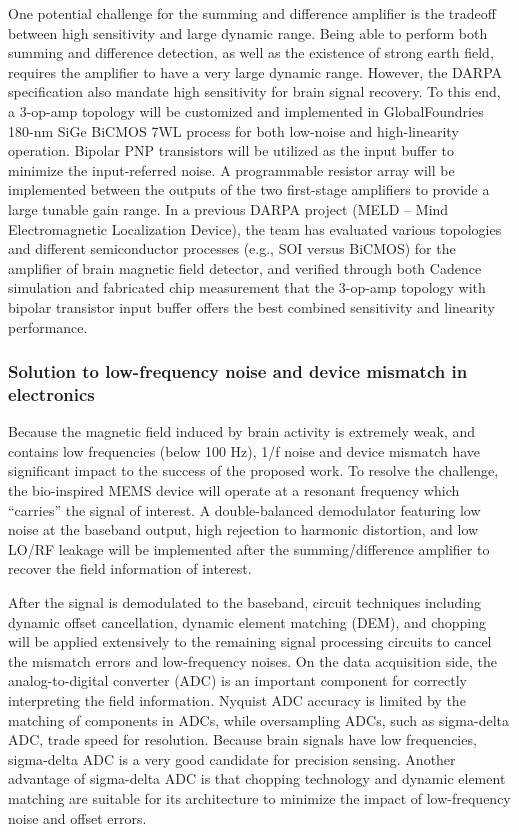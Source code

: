 One potential challenge for the summing and difference amplifier is the tradeoff between high sensitivity and large dynamic range. Being able to perform both summing and difference detection, as well as the existence of strong earth field, requires the amplifier to have a very large dynamic range. However, the DARPA specification also mandate high sensitivity for brain signal recovery. To this end, a 3-op-amp topology will be customized and implemented in GlobalFoundries 180-nm SiGe BiCMOS 7WL process for both low-noise and high-linearity operation. Bipolar PNP transistors will be utilized as the input buffer to minimize the input-referred noise. A programmable resistor array will be implemented between the outputs of the two first-stage amplifiers to provide a large tunable gain range. In a previous DARPA project (MELD – Mind Electromagnetic Localization Device), the team has evaluated various topologies and different semiconductor processes (e.g., SOI versus BiCMOS) for the amplifier of brain magnetic field detector, and verified through both Cadence simulation and fabricated chip measurement that the 3-op-amp topology with bipolar transistor input buffer offers the best combined sensitivity and linearity performance.

\subsubsection{Solution to low-frequency noise and device mismatch in electronics}

Because the magnetic field induced by brain activity is extremely weak, and contains low frequencies (below 100 Hz), 1/f noise and device mismatch have significant impact to the success of the proposed work. To resolve the challenge, the bio-inspired MEMS device will operate at a resonant frequency which “carries” the signal of interest. A double-balanced demodulator featuring low noise at the baseband output, high rejection to harmonic distortion, and low LO/RF leakage will be implemented after the summing/difference amplifier to recover the field information of interest. 

After the signal is demodulated to the baseband, circuit techniques including dynamic offset cancellation, dynamic element matching (DEM), and chopping will be applied extensively to the remaining signal processing circuits to cancel the mismatch errors and low-frequency noises. On the data acquisition side, the analog-to-digital converter (ADC) is an important component for correctly interpreting the field information. Nyquist ADC accuracy is limited by the matching of components in ADCs, while oversampling ADCs, such as sigma-delta ADC, trade speed for resolution. Because brain signals have low frequencies, sigma-delta ADC is a very good candidate for precision sensing. Another advantage of sigma-delta ADC is that chopping technology and dynamic element matching are suitable for its architecture to minimize the impact of low-frequency noise and offset errors.


